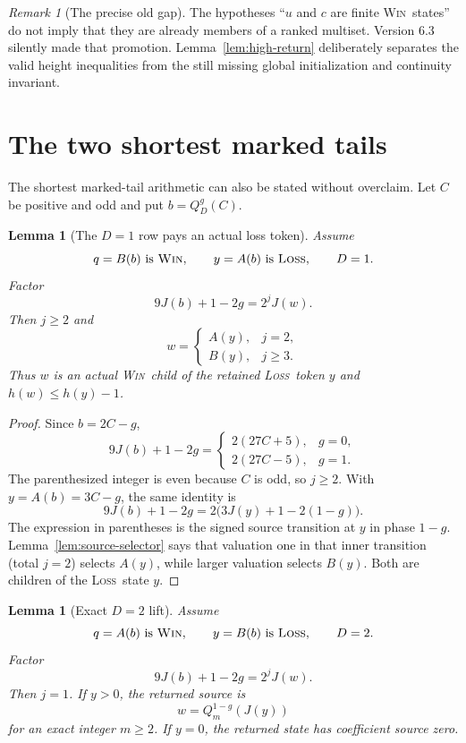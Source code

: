\documentclass[11pt,a4paper]{article}
\newtheorem{lemma}[theorem]{Lemma}
\theoremstyle{definition}
\theoremstyle{remark}
\newtheorem{remark}[theorem]{Remark}
\newcommand{\WIN}{\textnormal{\textsc{Win}}}
\newcommand{\LOSS}{\textnormal{\textsc{Loss}}}
\begin{document}
\begin{remark}[The precise old gap]
The hypotheses ``$u$ and $c$ are finite \WIN\ states'' do not imply that
they are already members of a ranked multiset.  Version 6.3 silently made
that promotion.  Lemma~\ref{lem:high-return} deliberately separates the
valid height inequalities from the still missing global initialization and
continuity invariant.
\end{remark}

\section{The two shortest marked tails}

The shortest marked-tail arithmetic can also be stated without overclaim.
Let $C$ be positive and odd and put $b=Q_D^g(C)$.

\begin{lemma}[The $D=1$ row pays an actual loss token]\label{lem:D1}
Assume
\[
 q=B(b)\text{ is \WIN},
 \qquad
 y=A(b)\text{ is \LOSS},
 \qquad D=1.
\]
Factor
\[
 9J(b)+1-2g=2^j J(w).
\]
Then $j\ge2$ and
\[
 w=\begin{cases}
     A(y),&j=2,\\
     B(y),&j\ge3.
   \end{cases}
\]
Thus $w$ is an actual \WIN\ child of the retained \LOSS\ token $y$ and
$h(w)\le h(y)-1$.
\end{lemma}

\begin{proof}
Since $b=2C-g$,
\[
 9J(b)+1-2g=
 \begin{cases}
  2(27C+5),&g=0,\\
  2(27C-5),&g=1.
 \end{cases}
\]
The parenthesized integer is even because $C$ is odd, so $j\ge2$.
With $y=A(b)=3C-g$, the same identity is
\[
 9J(b)+1-2g
 =2\bigl(3J(y)+1-2(1-g)\bigr).
\]
The expression in parentheses is the signed source transition at
$y$ in phase $1-g$.  Lemma~\ref{lem:source-selector} says that valuation one
in that inner transition (total $j=2$) selects $A(y)$, while larger valuation
selects $B(y)$.  Both are children of the
\LOSS\ state $y$.
\end{proof}

\begin{lemma}[Exact $D=2$ lift]\label{lem:D2}
Assume
\[
 q=A(b)\text{ is \WIN},
 \qquad
 y=B(b)\text{ is \LOSS},
 \qquad D=2.
\]
Factor
\[
 9J(b)+1-2g=2^j J(w).
\]
Then $j=1$.  If $y>0$, the returned source is
\[
  w=Q_m^{1-g}(J(y))
\]
for an exact integer $m\ge2$.  If $y=0$, the returned state has coefficient
source zero.
\end{lemma}
\end{document}
